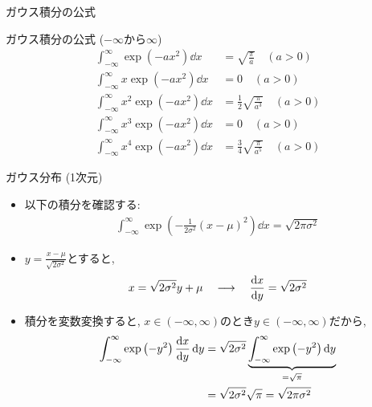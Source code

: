 \documentclass[dvipdfmx,notheorems,t]{beamer}
\begin{document}
\begin{frame}{ガウス積分の公式}
\begin{block}{ガウス積分の公式 ($-\infty$から$\infty$)}
  \begin{align*}
    \int_{-\infty}^\infty \exp \left( -a x^2 \right) \dd{x}
      &= \sqrt{\frac{\pi}{a}} \quad (a > 0) \\
    \int_{-\infty}^\infty x \exp \left( -a x^2 \right) \dd{x}
      &= 0 \quad (a > 0) \\
    \int_{-\infty}^\infty x^2 \exp \left( -a x^2 \right) \dd{x}
      &= \frac{1}{2} \sqrt{\frac{\pi}{a^3}} \quad (a > 0) \\
    \int_{-\infty}^\infty x^3 \exp \left( -a x^2 \right) \dd{x}
      &= 0 \quad (a > 0) \\
    \int_{-\infty}^\infty x^4 \exp \left( -a x^2 \right) \dd{x}
      &= \frac{3}{4} \sqrt{\frac{\pi}{a^5}} \quad (a > 0)
  \end{align*}
\end{block}
\end{frame}

\begin{frame}{ガウス分布 (1次元)}
\begin{itemize}
  \item 以下の積分を確認する:
  \begin{align*}
    \int_{-\infty}^\infty \exp \left( -\frac{1}{2 \sigma^2} \left( x - \mu \right)^2 \right) \dd{x}
      = \sqrt{2 \pi \sigma^2}
  \end{align*}
  \item $y = \frac{x - \mu}{\sqrt{2 \sigma^2}}$とすると,
  \begin{align*}
    x = \sqrt{2 \sigma^2} y + \mu \quad \longrightarrow \quad
      \dv{x}{y} = \sqrt{2 \sigma^2}
  \end{align*}
  \item 積分を変数変換すると, $x \in (-\infty, \infty)$のとき$y \in (-\infty, \infty)$だから,
  \begin{align*}
    \int_{-\infty}^\infty \exp \left( -y^2 \right) \dv{x}{y} \dd{y}
      &= \sqrt{2 \sigma^2} \underbrace{\int_{-\infty}^\infty \exp \left( -y^2 \right) \dd{y}}_{= \sqrt{\pi}} \\
      &= \sqrt{2 \sigma^2} \sqrt{\pi} = \sqrt{2 \pi \sigma^2}
  \end{align*}
\end{itemize}
\end{frame}
\end{document}

